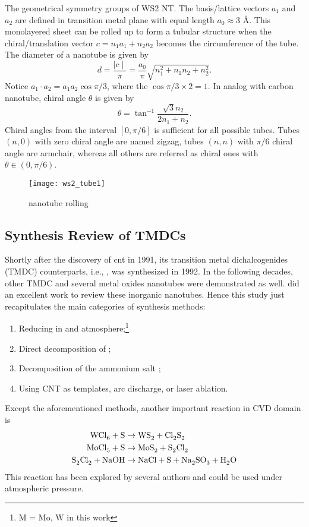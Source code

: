 The geometrical symmetry groups of WS2 NT.\cite{Milosevic2000} The basis/lattice vectors $a_1$ and $a_2$ are defined in transition metal plane with equal length $a_0 \approx 3$ \si{\angstrom}. This monolayered sheet can be rolled up to form a tubular structure when the chiral/translation vector $c = n_1a_1 + n_2a_2$ becomes the circumference of the tube. The diameter of a nanotube is given by 
\begin{equation}
d = \frac{\mid c \mid}{\pi} = \frac{a_0}{\pi}\sqrt{n_1^2 + n_1n_2 + n_2^2}.
\end{equation}
Notice $a_1 \cdot a_2 = a_1a_2 \cos\pi/3$, where the $\cos\pi/3 \times 2 = 1$. In analog with carbon nanotube, chiral angle $\theta$ is given by
\begin{equation}
\theta = \tan^{-1}\frac{\sqrt{3}n_2}{2n_1 + n_2}.
\end{equation}
Chiral angles from the interval $[0,\pi/6]$ is sufficient for all possible tubes. Tubes $(n,0)$ with zero chiral angle are named zigzag, tubes $(n,n)$ with $\pi/6$ chiral angle are armchair, whereas all others are referred as chiral ones with $\theta \in (0,\pi/6)$. 
\begin{figure}[htb]
\centering
\texttt{[image: ws2\_tube1]}
\caption[ nanotube rolling]{ nanotube rolling}
\label{fig:ch5ntroll}
\end{figure}

\subsection{Synthesis Review of TMDCs}
Shortly after the discovery of \gls{cnt} in 1991,\cite{Iijima1991} its transition metal dichalcogenides (TMDC) counterparts, i.e., , was synthesized in 1992.\cite{Tenne1992} In the following decades, other TMDC and several metal oxides nanotubes were demonstrated as well. \citeauthor{Rao2003} did an excellent work to review these inorganic nanotubes.\cite{Rao2003} Hence this study just recapitulates the main categories of synthesis methods:
\begin{enumerate}
\item Reducing  in  and  atmosphere;\footnote{M = Mo, W in this work}
\item Direct decomposition of ;
\item Decomposition of the ammonium salt ;
\item Using CNT as templates, arc discharge, or laser ablation.
\end{enumerate}
Except the aforementioned methods, another important reaction in CVD domain is
\begin{align}
\cee{WCl6 + S &\rightarrow WS2 + Cl2S2}\\
\cee{MoCl5 + S &\rightarrow MoS2 + S2Cl2} \\
\cee{S2Cl2 + NaOH &\rightarrow NaCl + S + Na2SO3 + H2O}
\end{align}
This reaction has been explored by several authors\cite{Stoffels1999} and could be used under atmospheric pressure.\cite{Li2004a}


